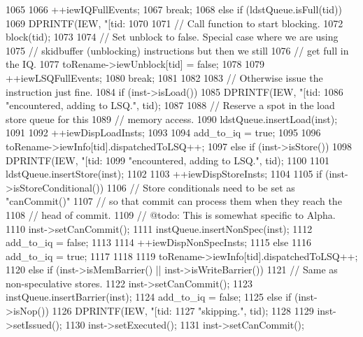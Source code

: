 \begin{DoxyCode}
{{{1065 
1066             ++iewIQFullEvents;
1067             break;
1068         } else if (ldstQueue.isFull(tid)) {
1069             DPRINTF(IEW, "[tid:%
1070 
1071             // Call function to start blocking.
1072             block(tid);
1073 
1074             // Set unblock to false. Special case where we are using
1075             // skidbuffer (unblocking) instructions but then we still
1076             // get full in the IQ.
1077             toRename->iewUnblock[tid] = false;
1078 
1079             ++iewLSQFullEvents;
1080             break;
1081         }
1082 
1083         // Otherwise issue the instruction just fine.
1084         if (inst->isLoad()) {
1085             DPRINTF(IEW, "[tid:%
1086                     "encountered, adding to LSQ.\n", tid);
1087 
1088             // Reserve a spot in the load store queue for this
1089             // memory access.
1090             ldstQueue.insertLoad(inst);
1091 
1092             ++iewDispLoadInsts;
1093 
1094             add_to_iq = true;
1095 
1096             toRename->iewInfo[tid].dispatchedToLSQ++;
1097         } else if (inst->isStore()) {
1098             DPRINTF(IEW, "[tid:%
1099                     "encountered, adding to LSQ.\n", tid);
1100 
1101             ldstQueue.insertStore(inst);
1102 
1103             ++iewDispStoreInsts;
1104 
1105             if (inst->isStoreConditional()) {
1106                 // Store conditionals need to be set as "canCommit()"
1107                 // so that commit can process them when they reach the
1108                 // head of commit.
1109                 // @todo: This is somewhat specific to Alpha.
1110                 inst->setCanCommit();
1111                 instQueue.insertNonSpec(inst);
1112                 add_to_iq = false;
1113 
1114                 ++iewDispNonSpecInsts;
1115             } else {
1116                 add_to_iq = true;
1117             }
1118 
1119             toRename->iewInfo[tid].dispatchedToLSQ++;
1120         } else if (inst->isMemBarrier() || inst->isWriteBarrier()) {
1121             // Same as non-speculative stores.
1122             inst->setCanCommit();
1123             instQueue.insertBarrier(inst);
1124             add_to_iq = false;
1125         } else if (inst->isNop()) {
1126             DPRINTF(IEW, "[tid:%
1127                     "skipping.\n", tid);
1128 
1129             inst->setIssued();
1130             inst->setExecuted();
1131             inst->setCanCommit();
}}}
\end{DoxyCode}
